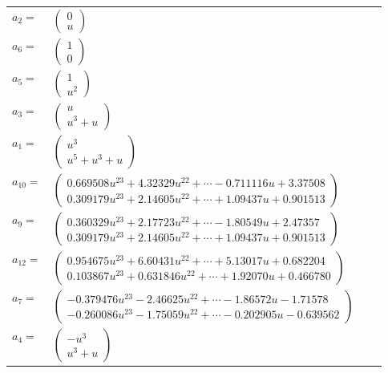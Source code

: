 \documentclass[1p]{elsarticle_modified}
\theoremstyle{definition}
\begin{document}
\begin{tabular}{m{7pt} m{180pt} m{7pt} m{180pt} }
\flushright $a_{2}=$&$\begin{pmatrix}0\\u\end{pmatrix}$ \\
\flushright $a_{6}=$&$\begin{pmatrix}1\\0\end{pmatrix}$ \\
\flushright $a_{5}=$&$\begin{pmatrix}1\\u^2\end{pmatrix}$ \\
\flushright $a_{3}=$&$\begin{pmatrix}u\\u^3+u\end{pmatrix}$ \\
\flushright $a_{1}=$&$\begin{pmatrix}u^3\\u^5+u^3+u\end{pmatrix}$ \\
\flushright $a_{10}=$&$\begin{pmatrix}0.669508 u^{23}+4.32329 u^{22}+\cdots-0.711116 u+3.37508\\0.309179 u^{23}+2.14605 u^{22}+\cdots+1.09437 u+0.901513\end{pmatrix}$ \\
\flushright $a_{9}=$&$\begin{pmatrix}0.360329 u^{23}+2.17723 u^{22}+\cdots-1.80549 u+2.47357\\0.309179 u^{23}+2.14605 u^{22}+\cdots+1.09437 u+0.901513\end{pmatrix}$ \\
\flushright $a_{12}=$&$\begin{pmatrix}0.954675 u^{23}+6.60431 u^{22}+\cdots+5.13017 u+0.682204\\0.103867 u^{23}+0.631846 u^{22}+\cdots+1.92070 u+0.466780\end{pmatrix}$ \\
\flushright $a_{7}=$&$\begin{pmatrix}-0.379476 u^{23}-2.46625 u^{22}+\cdots-1.86572 u-1.71578\\-0.260086 u^{23}-1.75059 u^{22}+\cdots-0.202905 u-0.639562\end{pmatrix}$ \\
\flushright $a_{4}=$&$\begin{pmatrix}- u^3\\u^3+u\end{pmatrix}$ \\

\end{tabular}
\end{document}
